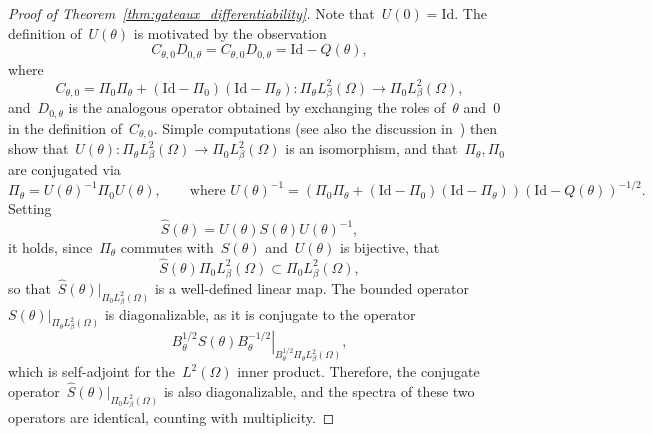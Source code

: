 \documentclass[a4]{article}
\newcommand{\1}{\mathbbm 1}
\newcommand{\Id}{\mathrm{Id}}
\begin{document}
\begin{proof}[Proof of Theorem~\ref{thm:gateaux_differentiability}]
    Note that~$U(0)=\Id$. The definition of~$U(\theta)$ is motivated by the observation
    \begin{equation}
        C_{\theta,0}D_{0,\theta} = C_{\theta,0}D_{0,\theta} = \Id-Q(\theta),
    \end{equation}
    where
    $$C_{\theta,0} = \Pi_0\Pi_\theta + (\Id-\Pi_0)(\Id-\Pi_\theta):\Pi_\theta L^2_\beta(\Omega)\to \Pi_0 L^2_\beta(\Omega),$$
    and~$D_{0,\theta}$ is the analogous operator obtained by exchanging the roles of~$\theta$ and~$0$ in the definition of~$C_{\theta,0}$.
    Simple computations (see also the discussion in~\cite[Section I.4.6]{K13}) then show that~$U(\theta):\Pi_\theta L_\beta^2(\Omega)\to\Pi_0 L^2_\beta(\Omega)$ is an isomorphism,
    and that~$\Pi_\theta,\Pi_0$ are conjugated via
    \begin{equation}
        \label{eq:derivative_conjugation}
        \Pi_\theta = U(\theta)^{-1}\Pi_0 U(\theta),\qquad\text{where }U(\theta)^{-1} = \left(\Pi_0\Pi_\theta+(\Id-\Pi_0)(\Id-\Pi_\theta)\right)(\Id-Q(\theta))^{-1/2}.
    \end{equation}
    Setting
    \begin{equation}
        \label{eq:conjugation}
        \widehat{S}(\theta)=U(\theta) S(\theta)U(\theta)^{-1},
    \end{equation}
    it holds, since~$\Pi_\theta$ commutes with~$S(\theta)$ and~$U(\theta)$ is bijective, that
    \begin{equation}
        \widehat S(\theta){\Pi_0 L^2_\beta(\Omega)} \subset {\Pi_0 L^2_\beta(\Omega)},
    \end{equation}
    so that~$\widehat S(\theta)|_{{\Pi_0 L^2_\beta(\Omega)}}$ is a well-defined linear map. The bounded operator~$S(\theta)|_{{\Pi_\theta L^2_\beta(\Omega)}}$ is diagonalizable, as it is conjugate to the operator
    $$\left.B_\theta^{1/2}S(\theta)B_\theta^{-1/2}\right|_{B_\theta^{1/2}{\Pi_\theta L^2_\beta(\Omega)}},$$
    which is self-adjoint for the~$L^2(\Omega)$ inner product. Therefore, the conjugate operator~$\widehat S(\theta)|_{{\Pi_0 L^2_\beta(\Omega)}}$ is also diagonalizable, and the spectra of these two operators are identical, counting with multiplicity.


\end{proof}
\end{document}
